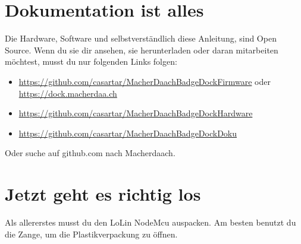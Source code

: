 \documentclass{article}
\begin{document}
\section{Dokumentation ist alles}

Die Hardware, Software und selbstverständlich diese Anleitung, sind Open Source. Wenn du sie dir ansehen, sie herunterladen oder daran mitarbeiten möchtest, musst du nur folgenden Links folgen:

\begin{itemize}
	\item \url{https://github.com/casartar/MacherDaachBadgeDockFirmware} oder \url{https://dock.macherdaa.ch}
	\item \url{https://github.com/casartar/MacherDaachBadgeDockHardware}
	\item \url{https://github.com/casartar/MacherDaachBadgeDockDoku}
\end{itemize}

Oder suche auf github.com nach Macherdaach.

\section{Jetzt geht es richtig los}
Als allererstes musst du den LoLin NodeMcu auspacken. Am besten benutzt du die Zange, um die Plastikverpackung zu öffnen.

\vspace{1cm}
\end{document}
